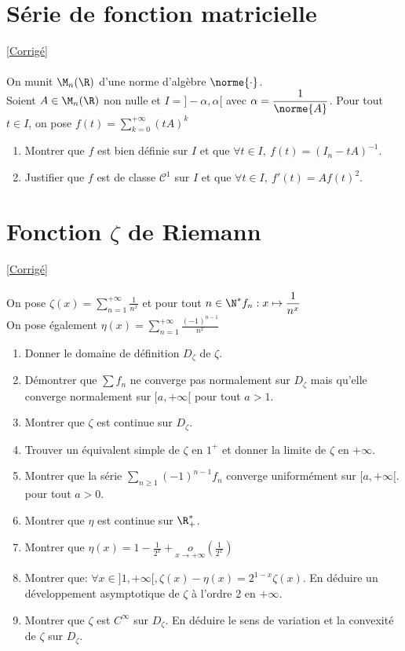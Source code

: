 \documentclass{book}
\begin{document}
	\section{Série de fonction matricielle}
	\textcolor{blue}{\hyperref[sec:serie-de-fonction-matricielle]{[Corrigé]}}\\
	\label{Série de fonction matricielle}\\
	On munit $\M_n(\R)$ d'une norme d'algèbre $\norme{\cdot}$.\\
	Soient $A\in\M_n(\R)$ non nulle et $I=]-\alpha,\alpha[$ avec $\alpha=\dfrac{1}{\norme{A}}$. Pour tout $t\in I$, on pose $f(t)=\displaystyle\sum_{k=0}^{+\infty}(tA)^k$
	\begin{enumerate}
		\item Montrer que $f$ est bien définie sur $I$ et que $\forall t\in I,\ f(t)=(I_n-tA)^{-1}$.
		\item Justifier que $f$ est de classe $\mathcal C^1$ sur $I$ et que $\forall t\in I,\ f'(t)=Af(t)^2$.
	\end{enumerate}
	
	\section{Fonction $\zeta$ de Riemann}
	\textcolor{blue}{\hyperref[sec:fonction-zeta-de-riemann]{[Corrigé]}}\\
	\label{Fonction zeta de Riemann}\\
	On pose $\zeta(x)=\displaystyle\sum\limits_{n=1}^{+\infty}\frac{1}{n^x}$ et pour tout $n\in\N^* f_n:x\mapsto\displaystyle\frac{1}{n^x}$
	\\On pose également $\eta(x)=\displaystyle\sum\limits_{n=1}^{+\infty}\frac{(-1)^{n-1}}{n^x}$ 
	\begin{enumerate}[leftmargin=*,noitemsep]
		\item Donner le domaine de définition $D_{\zeta}$ de $\zeta$.
		\item Démontrer que $\sum f_n$ ne converge pas normalement sur $D_{\zeta}$ mais qu'elle converge normalement sur $[a,+\infty[ $ pour tout $a>1$.
		\item Montrer que $\zeta$ est continue sur $D_{\zeta}$.
		\item Trouver un équivalent simple de $\zeta$ en $1^+$ et donner la limite de $\zeta$ en $+\infty$.
		\item Montrer que la série $\sum\limits_{n\geq1}(-1)^{n-1}f_n$ converge uniformément sur $[a,+\infty[$. pour tout $a>0$.
		\item Montrer que $\eta$ est continue sur $\R_+^*$.
		\item Montrer que $\eta(x)=1-\displaystyle \frac{1}{2^x}+ \underset{x\to +\infty}{o}\left(\displaystyle\frac{1}{2^x}\right)$
		\item Montrer que: $\forall x\in]1,+\infty[, \zeta(x)-\eta(x)=2^{1-x}\zeta(x)$. En déduire un développement asymptotique de $\zeta$ à l'ordre 2 en $+\infty$.
		\item Montrer que $\zeta$ est $C^{\infty}$ sur $D_{\zeta}$. En déduire le sens de variation et la convexité de $\zeta$ sur $D_{\zeta}$.
	\end{enumerate}
	
\end{document}
